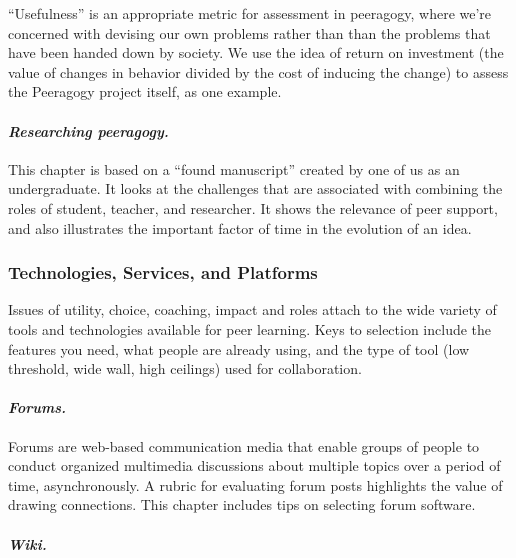 ``Usefulness'' is an appropriate metric for assessment in peeragogy,
where we're concerned with devising our own problems rather than than
the problems that have been handed down by society. We use the idea of
return on investment (the value of changes in behavior divided by the
cost of inducing the change) to assess the Peeragogy project itself, as
one example.

\hypertarget{researching-peeragogy.}{%
\paragraph{\texorpdfstring{\emph{Researching
peeragogy.}}{Researching peeragogy.}}\label{researching-peeragogy.}}

This chapter is based on a ``found manuscript'' created by one of us as
an undergraduate. It looks at the challenges that are associated with
combining the roles of student, teacher, and researcher. It shows the
relevance of peer support, and also illustrates the important factor of
time in the evolution of an idea.

\hypertarget{technologies-services-and-platforms}{%
\subsubsection{Technologies, Services, and
Platforms}\label{technologies-services-and-platforms}}

Issues of utility, choice, coaching, impact and roles attach to the wide
variety of tools and technologies available for peer learning. Keys to
selection include the features you need, what people are already using,
and the type of tool (low threshold, wide wall, high ceilings) used for
collaboration.

\hypertarget{forums.}{%
\paragraph{\texorpdfstring{\emph{Forums.}}{Forums.}}\label{forums.}}

Forums are web-based communication media that enable groups of people to
conduct organized multimedia discussions about multiple topics over a
period of time, asynchronously. A rubric for evaluating forum posts
highlights the value of drawing connections. This chapter includes tips
on selecting forum software.

\hypertarget{wiki.}{%
\paragraph{\texorpdfstring{\emph{Wiki.}}{Wiki.}}\label{wiki.}}

